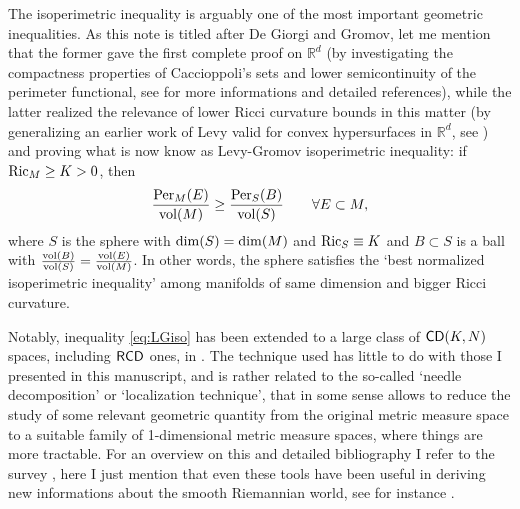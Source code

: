 \documentclass[11pt]{article}
\numberwithin{equation}{section}
\newcommand{\R}{\mathbb{R}}
\newcommand{\CD}{{\sf CD}}
\newcommand{\RCD}{{\sf RCD}}
\begin{document}
The isoperimetric inequality is arguably one of the most important geometric inequalities. As this note is titled after De Giorgi and Gromov, let me mention that the former gave the first complete proof on $\R^d$ (by investigating the compactness properties of Caccioppoli's sets and lower semicontinuity of the perimeter functional, see \cite{DeGiorgiSelected} for more informations and detailed references), while the latter realized the relevance of lower Ricci curvature bounds in this matter (by generalizing an earlier work of Levy valid for convex hypersurfaces in $\R^d$, see \cite{Gromov07}) and proving what is now know as Levy-Gromov isoperimetric inequality:  if ${\rm Ric}_M\geq K>0$, then
\begin{equation}
\label{eq:LGiso}
\frac{{\rm Per}_M(E)}{{\rm vol}(M)}\geq \frac{{\rm Per}_S(B)}{{\rm vol}(S)}\qquad\forall E\subset M,
\end{equation}
where $S$ is the sphere with ${\rm dim}(S)={\rm dim}(M)$ and ${\rm Ric}_S\equiv K$ and $B\subset S$ is a ball with $\frac{{\rm vol}(B)}{{\rm vol}(S)}=\frac{{\rm vol}(E)}{{\rm vol}(M)}$. In other words, the sphere satisfies the `best normalized isoperimetric inequality' among manifolds of same dimension and bigger Ricci curvature. 

Notably, inequality \eqref{eq:LGiso} has been extended to a large class of $\CD(K,N)$ spaces, including $\RCD$ ones, in  \cite{CavMon15}. The technique used has little to do with those I presented in this manuscript, and is rather related to the so-called `needle decomposition' or `localization technique', that in some sense allows to reduce the study of some relevant geometric quantity from the original metric measure space to a suitable family of 1-dimensional metric measure spaces, where things are more tractable. For an overview on this and  detailed bibliography I refer to  the survey \cite{Cavalletti17}, here I just mention that even these tools have been useful in deriving new informations about the smooth Riemannian world, see for instance \cite{CMM19}.

\medskip
\end{document}
